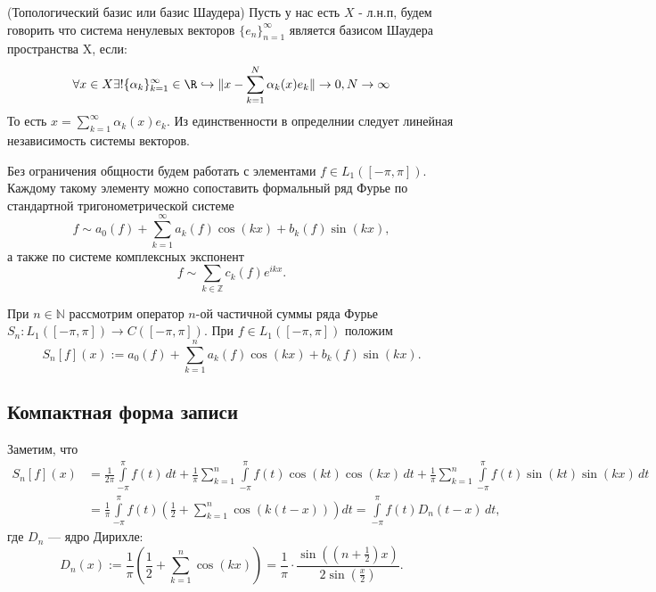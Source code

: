 \begin{definition}
    (Топологический базис или базис Шаудера)
    Пусть у нас есть $X$ - л.н.п, будем говорить что система ненулевых векторов $\{e_n\}_{n=1}^{\infty}$ является базисом Шаудера пространства X, если:
    \[
    \forall x \in X \exists! \{\alpha_k\}_{k=1}^{\infty} \in \R \hookrightarrow \| x - \sum_{k=1}^{N} \alpha_k(x) e_k\| \to 0, N \to \infty
    \]
    То есть $x = \sum\limits_{k=1}^{\infty} \alpha_k(x) e_k$. Из единственности в определнии следует линейная независимость системы векторов.
\end{definition}



Без ограничения общности будем работать с элементами $f \in L_{1}([-\pi,\pi])$. Каждому такому элементу можно сопоставить формальный ряд Фурье по стандартной тригонометрической системе
$$
f \sim a_{0}(f)+\sum\limits_{k=1}^{\infty}a_{k}(f)\cos(kx) + b_{k}(f)\sin(kx),
$$
а также по системе комплексных экспонент
$$
f \sim \sum\limits_{k \in \mathbb{Z}}c_{k}(f)e^{ikx}.
$$

При $n \in \mathbb{N}$ рассмотрим оператор $n$-ой частичной суммы ряда Фурье $S_{n}:L_{1}([-\pi,\pi]) \to C([-\pi,\pi])$. При $f \in L_{1}([-\pi,\pi])$ положим
$$
S_{n}[f](x):=a_{0}(f)+\sum\limits_{k=1}^{n}a_{k}(f)\cos(kx) + b_{k}(f)\sin(kx).
$$

\subsection{Компактная форма записи}

Заметим, что
\begin{equation}
\label{eqq.6}
\begin{split}
S_n[f](x) &= \frac{1}{2\pi} \int\limits_{-\pi}^{\pi} f(t)\,dt 
+ \frac{1}{\pi} \sum\limits_{k=1}^{n} \int\limits_{-\pi}^{\pi} f(t) \cos(kt) \cos(kx)\,dt 
+ \frac{1}{\pi} \sum\limits_{k=1}^{n} \int\limits_{-\pi}^{\pi} f(t) \sin(kt) \sin(kx)\,dt \\
&= \frac{1}{\pi} \int\limits_{-\pi}^{\pi} f(t) \left( \frac{1}{2} + \sum\limits_{k=1}^{n} \cos(k(t - x)) \right) dt 
= \int\limits_{-\pi}^{\pi} f(t) D_n(t - x)\,dt,
\end{split}
\end{equation}
где \( D_n \) — ядро Дирихле:
\begin{equation}
\label{eqq.7}
D_n(x) := \frac{1}{\pi} \left( \frac{1}{2} + \sum\limits_{k=1}^{n} \cos(kx) \right) = \frac{1}{\pi} \cdot \frac{\sin\left( \left(n + \frac{1}{2}\right) x \right)}{2 \sin\left( \frac{x}{2} \right)}.
\end{equation}


